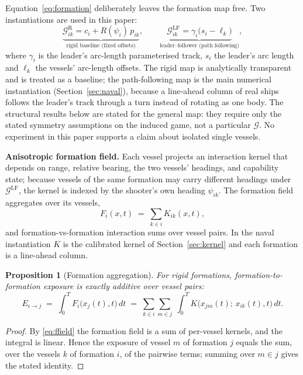 \documentclass[12pt,a4paper]{article}
\newtheorem{proposition}{Proposition}
\begin{document}
Equation~\eqref{eq:formation} deliberately leaves the formation map free.
Two instantiations are used in this paper:
\begin{equation}
\underbrace{\mathcal G^{\mathrm{R}}_{ik}
      = c_i + R(\psi_i)\,p_{ik}}_{\text{rigid baseline (fixed offsets)}},
\qquad
\underbrace{\mathcal G^{\mathrm{LF}}_{ik}
      = \gamma_i\bigl(s_i - \ell_k\bigr)}_{\text{leader--follower (path following)}},
\label{eq:two-maps}
\end{equation}
where $\gamma_i$ is the leader's arc-length parameterised track, $s_i$ the
leader's arc length and $\ell_k$ the vessels' arc-length offsets.  The rigid
map is analytically transparent and is treated as a baseline; the
path-following map is the main numerical instantiation
(Section~\ref{sec:naval}), because a line-ahead column of real ships follows
the leader's track through a turn instead of rotating as one body.  The
structural results below are stated for the general map: they require only
the stated symmetry assumptions on the induced game, not a particular
$\mathcal G$.  No experiment in this paper supports a claim about isolated
single vessels.

\noindent\textbf{Anisotropic formation field.}  Each vessel projects an
interaction kernel that depends on range, relative bearing, the two vessels'
headings, and capability state; because vessels of the same formation may
carry different headings under $\mathcal G^{\mathrm{LF}}$, the kernel is
indexed by the shooter's own heading $\psi_{ik}$.  The formation field
aggregates over its vessels,
\begin{equation}
F_i(x,t) \;=\; \sum_{k\in i} K_{ik}(x,t),
\label{eq:ffield}
\end{equation}
and formation-vs-formation interaction sums over vessel pairs.  In the
naval instantiation $K$ is the calibrated kernel of
Section~\ref{sec:kernel} and each formation is a line-ahead column.

\begin{proposition}[Formation aggregation]\label{prop:agg}
For rigid formations, formation-to-formation exposure is exactly additive
over vessel pairs:
\[
E_{i\to j}\;=\;\int_0^T F_i\bigl(x_j(t),t\bigr)\,dt
\;=\;\sum_{k\in i}\sum_{m\in j}\;
\int_0^T K\bigl(x_{jm}(t);\,x_{ik}(t),t\bigr)\,dt .
\]
\end{proposition}
\begin{proof}
By \eqref{eq:ffield} the formation field is a sum of per-vessel kernels,
and the integral is linear.  Hence the exposure of vessel $m$ of
formation $j$ equals the sum, over the vessels $k$ of formation $i$, of
the pairwise terms; summing over $m\in j$ gives the stated identity.
\end{proof}
\end{document}
